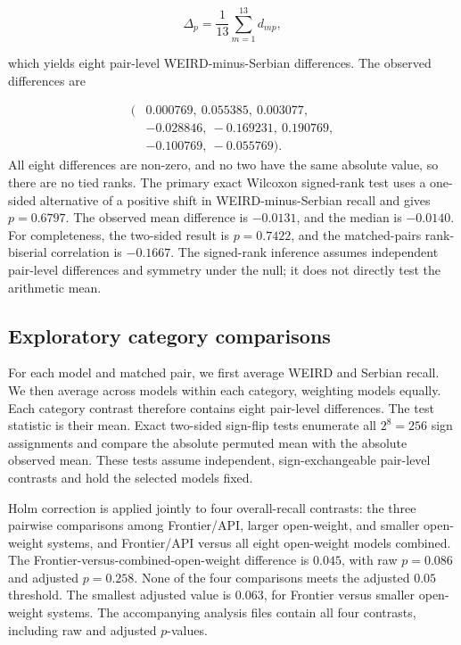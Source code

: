 \documentclass[11pt,a4paper]{article}
\begin{document}
\begin{equation}
 \Delta_p=\frac{1}{13}\sum_{m=1}^{13} d_{mp},
\end{equation}

which yields eight pair-level WEIRD-minus-Serbian differences. The observed differences are

\[
\begin{aligned}
(&0.000769,\ 0.055385,\ 0.003077,\\
 &-0.028846,\ -0.169231,\ 0.190769,\\
 &-0.100769,\ -0.055769).
\end{aligned}
\]
All eight differences are non-zero, and no two have the same absolute value, so there are no tied ranks. The primary exact Wilcoxon signed-rank test uses a one-sided alternative of a positive shift in WEIRD-minus-Serbian recall and gives $p=0.6797$. The observed mean difference is $-0.0131$, and the median is $-0.0140$. For completeness, the two-sided result is $p=0.7422$, and the matched-pairs rank-biserial correlation is $-0.1667$. The signed-rank inference assumes independent pair-level differences and symmetry under the null; it does not directly test the arithmetic mean.



\subsection{Exploratory category comparisons}
\label{app:category-tests}
For each model and matched pair, we first average WEIRD and Serbian recall. We then average across models within each category, weighting models equally. Each category contrast therefore contains eight pair-level differences. The test statistic is their mean. Exact two-sided sign-flip tests enumerate all $2^8=256$ sign assignments and compare the absolute permuted mean with the absolute observed mean. These tests assume independent, sign-exchangeable pair-level contrasts and hold the selected models fixed.

Holm correction is applied jointly to four overall-recall contrasts: the three pairwise comparisons among Frontier/API, larger open-weight, and smaller open-weight systems, and Frontier/API versus all eight open-weight models combined. The Frontier-versus-combined-open-weight difference is $0.045$, with raw $p=0.086$ and adjusted $p=0.258$. None of the four comparisons meets the adjusted $0.05$ threshold. The smallest adjusted value is $0.063$, for Frontier versus smaller open-weight systems. The accompanying analysis files contain all four contrasts, including raw and adjusted $p$-values.
\end{document}
